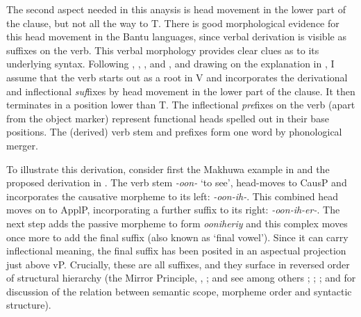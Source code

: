 \documentclass[output=paper
,modfonts
,nonflat]{langsci/langscibook}
\begin{document}
The second aspect needed in this anaysis is head movement in the lower part of the clause, but not all the way to T. There is good morphological evidence for this head movement in the Bantu languages, since verbal derivation is visible as suffixes on the verb. This verbal morphology provides clear clues as to its underlying syntax. Following \citet{Myers1990}, \citet{Julien2002}, \citet{Kinyalolo2003}, and \citet{Buell2005}, and drawing on the explanation in \citet{Van_der_Wal, 2009}, I assume that the verb starts out as a root in V and incorporates the derivational and inflectional \textit{suf}fixes by head movement in the lower part of the clause. It then terminates in a position lower than T. The inflectional \textit{pre}fixes on the verb (apart from the object marker) represent functional heads spelled out in their base positions. The (derived) verb stem and prefixes form one word by phonological merger.

To illustrate this derivation, consider first the Makhuwa example in  and the proposed derivation in . The verb stem \textit{-oon-} ‘to see’, head-moves to CausP and incorporates the causative morpheme to its left: \textit{-oon-ih-}. This combined head moves on to ApplP, incorporating a further suffix to its right: \textit{-oon-ih-er-}. The next step adds the passive morpheme to form \textit{ooniheriy} and this complex moves once more to add the final suffix (also known as ‘final vowel’). Since it can carry inflectional meaning, the final suffix has been posited in an aspectual projection just above vP. Crucially, these are all suffixes, and they surface in reversed order of structural hierarchy (the Mirror Principle, \citealt{Baker1985}, \citealt{Baker1988}; and see among others \citealt{Alsina1999}; \citealt{Hyman2003}; \citealt{Good2005}; and \citealt{Muriungi2008} for discussion of the relation between semantic scope, morpheme order and syntactic structure).

\end{document}
